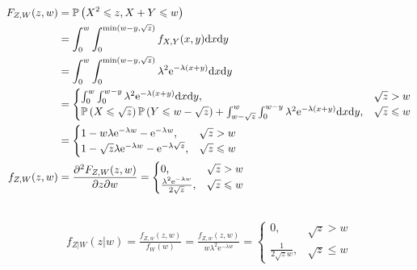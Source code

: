 \documentclass[8pt]{article}
\theoremstyle{compact}
\def\le{\leqslant}
\def\P#1{\mathbb{P}\left({#1}\right)}
\def\e{\mathrm{e}}
\begin{document}
\begin{equation}
	\begin{split}
		F_{Z, W}(z, w) &= \P{X^2 \le z, X + Y \le w} \\
		&= \int_{0}^{w} \int_{0}^{\min(w - y, \sqrt z)} f_{X, Y}(x, y) \text dx \text dy\\
		&= \int_{0}^{w} \int_{0}^{\min(w - y, \sqrt z)} \lambda^2\e^{-\lambda(x + y)} \text dx \text dy\\
		&= \begin{cases}
			\int_{0}^{w} \int_{0}^{w - y} \lambda^2\e^{-\lambda(x + y)} \text dx \text dy, & \sqrt z > w\\
			\P{X \le \sqrt z}\P{Y \le w - \sqrt z} + \int_{w - \sqrt z}^{w} \int_{0}^{w - y} \lambda^2\e^{-\lambda(x + y)} \text dx \text dy, & \sqrt z \le w
		\end{cases} \\
		&= \begin{cases}
			1 - w\lambda\e^{-\lambda w} - \e^{-\lambda w}, & \sqrt z > w\\
			1 - \sqrt z\lambda\e^{-\lambda w} - \e^{-\lambda \sqrt z}, & \sqrt z \le w
		\end{cases}\\
		f_{Z, W}(z, w) &= \frac{\partial^2 F_{Z, W}(z, w)}{\partial z \partial w} = \begin{cases}
			0, & \sqrt z > w\\
			\frac{\lambda^2\e^{-\lambda w}}{2\sqrt z}, & \sqrt z \le w
		\end{cases}
	\end{split}
\end{equation}
\subsection{}
\begin{equation}
	\begin{split}
		f_{Z | W}(z | w) = \frac{f_{Z, w}(z, w)}{f_W(w)} = \frac{f_{Z, w}(z, w)}{w\lambda^2\e^{-\lambda w}} = \begin{cases}
			0, & \sqrt z > w\\
			\frac{1}{2\sqrt z w}, & \sqrt z \le w
		\end{cases}
	\end{split}
\end{equation}

\section{}
\end{document}
